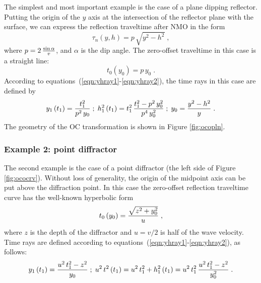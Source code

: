The simplest and most important example is the case of a plane dipping
reflector. Putting the origin of the $y$ axis at the intersection of
the reflector plane with the surface, we can express the reflection
traveltime after NMO in the form
\begin{equation}
\tau_n(y,h)=p\,\sqrt{y^2-h^2}\;,
\label{eqn:planett}
\end{equation}
where $p=2\,{ \sin{\alpha} \over v}$, and $\alpha$ is the dip angle. 
The zero-offset traveltime in this case is a straight line:
\begin{equation}
t_0\left(y_0\right)=p\,y_0\;.
\label{eqn:planezott}
\end{equation}
According to equations~(\ref{eqn:yhray1}-\ref{eqn:yhray2}), the time
rays in this case are defined by
\begin{equation}
y_1\left(t_1\right)={t_1^2 \over {p^2\,y_0}}\;;\;
h_1^2\left(t_1\right)=t_1^2\,{{t_1^2-p^2\,y_0^2} \over
{p^4\,y_0^2}}\;;\;
y_0={{y^2-h^2} \over y}\;.
\label{eqn:planerays}
\end{equation}
The geometry of the OC transformation is shown in Figure
\ref{fig:ocopln}.


\subsubsection{Example 2: point diffractor}

  The second example is the case of a point diffractor (the left side
  of Figure \ref{fig:ococrv}).  Without loss of generality, the origin
  of the midpoint axis can be put above the diffraction point. In this
  case the zero-offset reflection traveltime curve has the well-known
  hyperbolic form
\begin{equation}
t_0\left(y_0\right)={\sqrt{z^2+y_0^2} \over u}\;,
\label{eqn:pointzott}
\end{equation}
where $z$ is the depth of the diffractor and $u=v/2$ is half of the
wave velocity. Time rays are defined according to
equations~(\ref{eqn:yhray1}-\ref{eqn:yhray2}), as follows:
\begin{equation}
y_1\left(t_1\right)={{u^2\,t_1^2-z^2} \over y_0}\;;\;
u^2\,t^2\left(t_1\right)=u^2\,t_1^2+h_1^2\left(t_1\right)=
u^2\,t_1^2\,{{u^2\,t_1^2-z^2} \over y_0^2}\;.
\label{eqn:pointrays}
\end{equation}


